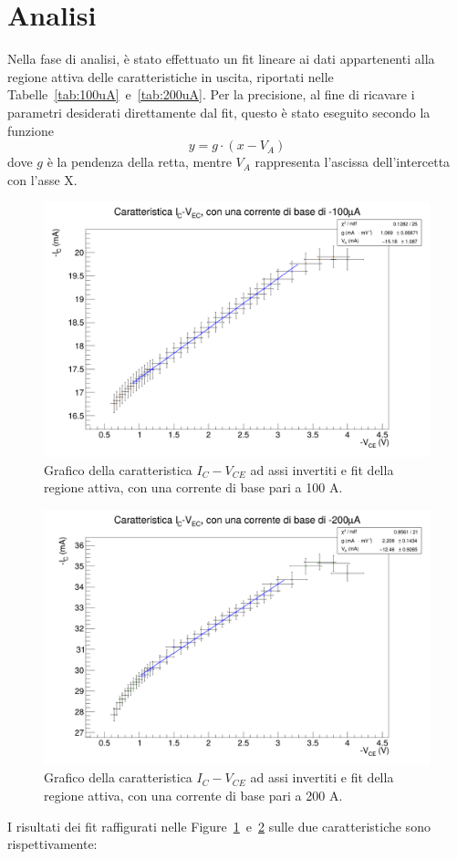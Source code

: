 \documentclass[../main.tex]{subfiles}
\begin{document}
    \section{Analisi}\label{sec:analisi}
%    
        Nella fase di analisi, è stato effettuato un fit lineare ai dati
        appartenenti alla regione attiva delle caratteristiche in
        uscita, riportati nelle
        Tabelle~\ref{tab:100uA}~e~\ref{tab:200uA}.
        Per la precisione, al fine di ricavare i parametri
        desiderati direttamente dal fit, questo è stato eseguito
        secondo la funzione
        \begin{equation*}
            y = g \cdot ( x - V_A)
        \end{equation*}
        dove $g$ è la pendenza della retta, mentre $V_A$ rappresenta
        l'ascissa dell'intercetta con l'asse X.

        \begin{figure}[h!]
            \centering
            \includegraphics[width=.69\textwidth]{../../images/caratteristica-100uA}
            \caption{
                Grafico della caratteristica $I_C - V_{CE}$ ad assi
                invertiti e fit della regione attiva, con una
                corrente di base pari a 100 \textmu A.
            }
            \label{fig:fit-100}
        \end{figure}
        \begin{figure}[h!]
            \centering
            \includegraphics[width=.69\textwidth]{../../images/caratteristica-200uA}
            \caption{
                Grafico della caratteristica $I_C - V_{CE}$ ad assi
                invertiti e fit della regione attiva, con una
                corrente di base pari a 200 \textmu A.
            }
            \label{fig:fit-200}
        \end{figure}
        I risultati dei fit raffigurati nelle
        Figure~\ref{fig:fit-100}~e~\ref{fig:fit-200} sulle due
        caratteristiche sono rispettivamente:
\end{document}
